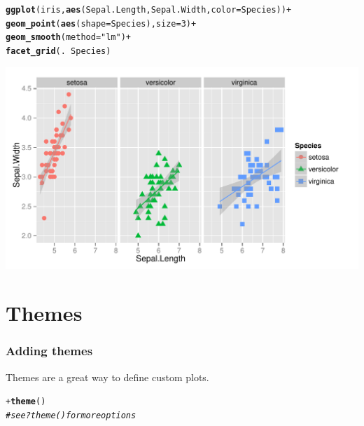 \documentclass{beamer}\usepackage[]{graphicx}\usepackage[]{color}
\makeatletter
\newcommand{\hlnum}[1]{\textcolor[rgb]{0.686,0.059,0.569}{#1}}%
\newcommand{\hlstr}[1]{\textcolor[rgb]{0.192,0.494,0.8}{#1}}%
\newcommand{\hlcom}[1]{\textcolor[rgb]{0.678,0.584,0.686}{\textit{#1}}}%
\newcommand{\hlopt}[1]{\textcolor[rgb]{0,0,0}{#1}}%
\newcommand{\hlstd}[1]{\textcolor[rgb]{0.345,0.345,0.345}{#1}}%
\newcommand{\hlkwc}[1]{\textcolor[rgb]{0.333,0.667,0.333}{#1}}%
\newcommand{\hlkwd}[1]{\textcolor[rgb]{0.737,0.353,0.396}{\textbf{#1}}}%
\newenvironment{kframe}{%
 \def\at@end@of@kframe{}%
 \ifinner\ifhmode%
  \def\at@end@of@kframe{\end{minipage}}%
  \begin{minipage}{\columnwidth}%
 \fi\fi%
 \def\FrameCommand##1{\hskip\@totalleftmargin \hskip-\fboxsep
 \colorbox{shadecolor}{##1}\hskip-\fboxsep
     \hskip-\linewidth \hskip-\@totalleftmargin \hskip\columnwidth}%
 \MakeFramed {\advance\hsize-\width
   \@totalleftmargin\z@ \linewidth\hsize
   \@setminipage}}%
 {\par\unskip\endMakeFramed%
 \at@end@of@kframe}
\newenvironment{knitrout}{}{} %
\makeatother
\begin{document}
\begin{frame}[fragile]
\begin{knitrout}\footnotesize
{}\color{fgcolor}\begin{kframe}
\begin{alltt}
\hlkwd{ggplot}\hlstd{(iris,} \hlkwd{aes}\hlstd{(Sepal.Length, Sepal.Width,} \hlkwc{color} \hlstd{= Species))} \hlopt{+}
\hlkwd{geom_point}\hlstd{(}\hlkwd{aes}\hlstd{(}\hlkwc{shape} \hlstd{= Species),} \hlkwc{size} \hlstd{=} \hlnum{3}\hlstd{)} \hlopt{+}
\hlkwd{geom_smooth}\hlstd{(}\hlkwc{method} \hlstd{=} \hlstr{"lm"}\hlstd{)} \hlopt{+}
\hlkwd{facet_grid}\hlstd{(.} \hlopt{~} \hlstd{Species)}
\end{alltt}
\end{kframe}

{\centering \includegraphics[width=.75\linewidth]{figure/adding_stats2_} 

}



\end{knitrout}
\end{frame}


\section*{Themes}
\frame{\sectionpage}


\begin{frame}[fragile]
\frametitle{Adding themes}
Themes are a great way to define custom plots.
\begin{knitrout}\footnotesize
{}\color{fgcolor}\begin{kframe}
\begin{alltt}
\hlopt{+} \hlkwd{theme}\hlstd{()}
\hlcom{# see ?theme() for more options}
\end{alltt}
\end{kframe}
\end{knitrout}
\end{frame}
\end{document}
